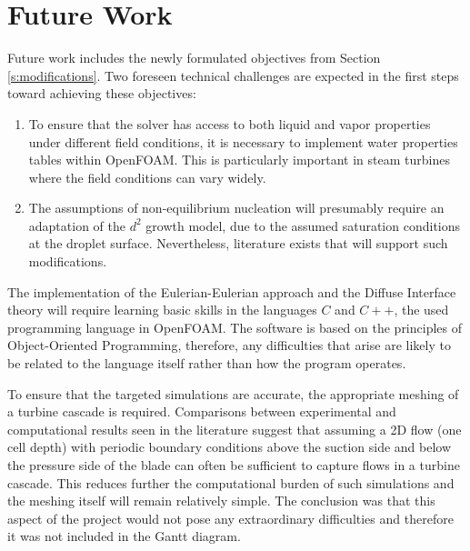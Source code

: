 \documentclass[12pt]{article}
\begin{document}
\section{Future Work}\label{s:future_work}
Future work includes the newly formulated objectives from Section \ref{s:modifications}. Two foreseen technical challenges are expected in the first steps toward achieving these objectives:
\begin{enumerate}
    \item To ensure that the solver has access to both liquid and vapor properties under different field conditions, it is necessary to implement water properties tables within OpenFOAM. This is particularly important in steam turbines where the field conditions can vary widely.
    \item The assumptions of non-equilibrium nucleation will presumably require an adaptation of the $d^2$ growth model, due to the assumed saturation conditions at the droplet surface. Nevertheless, literature exists that will support such modifications.
\end{enumerate}
The implementation of the Eulerian-Eulerian approach and the Diffuse Interface theory will require learning basic skills in the languages $C$ and $C++$, the used programming language in OpenFOAM. The software is based on the principles of Object-Oriented Programming, therefore, any difficulties that arise are likely to be related to the language itself rather than how the program operates. 

To ensure that the targeted simulations are accurate, the appropriate meshing of a turbine cascade is required. Comparisons between experimental and computational results seen in the literature suggest that assuming a 2D flow (one cell depth) with periodic boundary conditions above the suction side and below the pressure side of the blade can often be sufficient to capture flows in a turbine cascade. This reduces further the computational burden of such simulations and the meshing itself will remain relatively simple. The conclusion was that this aspect of the project would not pose any extraordinary difficulties and therefore it was not included in the Gantt diagram.
\newpage
\end{document}
